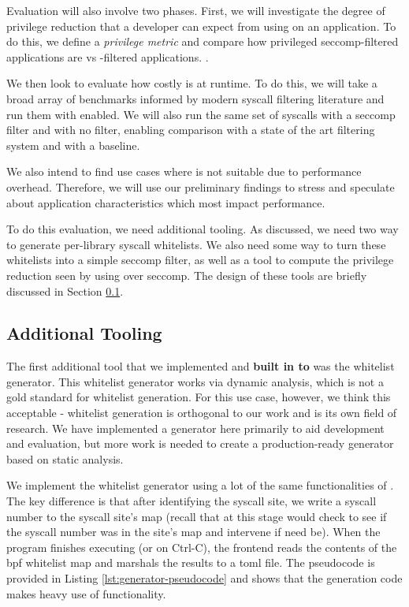 Evaluation will also involve two phases. First, we will investigate the degree
of privilege reduction that a developer can expect from using \af on an
application. To do this, we define a \textit{privilege metric} and compare how
privileged seccomp-filtered applications are vs \afss-filtered applications.
.

We then look to evaluate how costly \af is at runtime. To do this, we will take
a broad array of benchmarks informed by modern syscall filtering literature and
run them with \af enabled. We will also run the same set of syscalls with a
seccomp filter and with no filter, enabling comparison with a state of the art
filtering system and with a baseline.

We also intend to find use cases where \af is not suitable due to performance
overhead. Therefore, we will use our preliminary findings to stress \af and
speculate about application characteristics which most impact performance.

To do this evaluation, we need additional tooling. As discussed, we need two
way to generate per-library syscall whitelists. We also need some way to turn
these whitelists into a simple seccomp filter, as well as a tool to compute the
privilege reduction seen by using \af over seccomp. The design of these tools are
briefly discussed in Section \ref{subsubsec:additional-tooling}.

\subsection{Additional Tooling}\label{subsubsec:additional-tooling}

The first additional tool that we implemented and \textbf{built in to \af} was
the whitelist generator. This whitelist generator works via dynamic analysis,
which is not a gold standard for whitelist generation. For this use case,
however, we think this acceptable - whitelist generation is orthogonal to our
work and is its own field of research. We have implemented a generator here
primarily to aid development and evaluation, but more work is needed to create a
production-ready generator based on static analysis.

We implement the whitelist generator using a lot of the same functionalities of
\af. The key difference is that after identifying the syscall site, we write a
syscall number to the syscall site's map (recall that at this stage \af would
check to see if the syscall number was in the site's map and intervene if need
be). When the program finishes executing (or on Ctrl-C), the frontend reads the
contents of the bpf whitelist map and marshals the results to a \ac{toml} file.
The pseudocode is provided in Listing \ref{lst:generator-pseudocode} and shows
that the generation code makes heavy use of \afg functionality.

